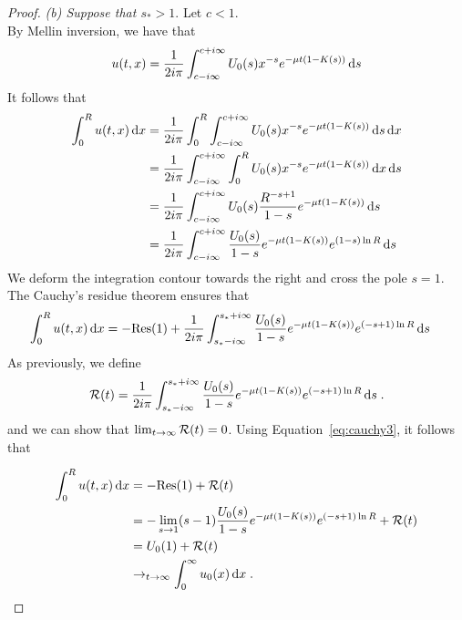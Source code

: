 \begin{proof}
            \textit{(b) Suppose that $s_* > 1$}. Let $c<1$. \\
            By Mellin inversion, we have that
            \begin{align*}
                u(t,x) = \frac{1}{2i\pi}\int_{c-i\infty}^{c+i\infty} U_0(s) x^{-s} e^{-\mu t(1 - K(s))} \,\mathrm{d} s
            \end{align*}
            It follows that
            \begin{align*}
                \int_0^R u(t,x) \,\mathrm{d} x 
                &= \frac{1}{2i\pi} \int_0^R \int_{c-i\infty}^{c+i\infty} U_0(s) x^{-s} e^{-\mu t(1 - K(s))} \,\mathrm{d} s \,\mathrm{d} x \\
                &= \frac{1}{2i\pi} \int_{c-i\infty}^{c+i\infty} \int_0^R U_0(s) x^{-s} e^{-\mu t(1 - K(s))} \,\mathrm{d} x \,\mathrm{d} s \\
                &= \frac{1}{2i\pi} \int_{c-i\infty}^{c+i\infty} U_0(s) \frac{R^{-s+1}}{1-s} e^{-\mu t(1 - K(s))} \,\mathrm{d} s \\
                &= \frac{1}{2i\pi} \int_{c-i\infty}^{c+i\infty} \frac{U_0(s)}{1-s} e^{-\mu t(1 - K(s))} e^{(1-s)\ln R} \,\mathrm{d} s \\
            \end{align*}
            We deform the integration contour towards the right and cross the pole $s = 1$. The Cauchy's residue theorem ensures that
            \begin{align}
                \int_0^R u(t,x) \,\mathrm{d} x &= -\mathrm{Res(1)} + \frac{1}{2i\pi} \int_{s_*-i\infty}^{s_*+i\infty} \frac{U_0(s)}{1-s} e^{-\mu t(1 - K(s))} e^{(-s+1)\ln R} \,\mathrm{d} s
                \label{eq:cauchy3}
            \end{align}
            As previously, we define
            \begin{align*}
                \mathcal{R}(t) = \frac{1}{2i\pi} \int_{s_*-i\infty}^{s_*+i\infty} \frac{U_0(s)}{1-s} e^{-\mu t(1 - K(s))} e^{(-s+1)\ln R} \,\mathrm{d} s
                \; .
            \end{align*}
            and we can show that $\lim_{t\to\infty}\mathcal{R}(t) = 0$. Using Equation~\ref{eq:cauchy3}, it follows that 
            
            \begin{align*}
                \int_0^R u(t,x) \,\mathrm{d} x &= -\mathrm{Res(1)} + \mathcal{R}(t) \\
                &= -\lim_{s \to 1} (s-1)\frac{U_0(s)}{1-s} e^{-\mu t(1 - K(s))} e^{(-s+1)\ln R}  + \mathcal{R}(t)\\
                &= U_0(1) + \mathcal{R}(t)\\
                &\to_{t \to \infty} \int_0^\infty u_0(x) \,\mathrm{d} x
                \; .
            \end{align*}
            

\end{proof}

